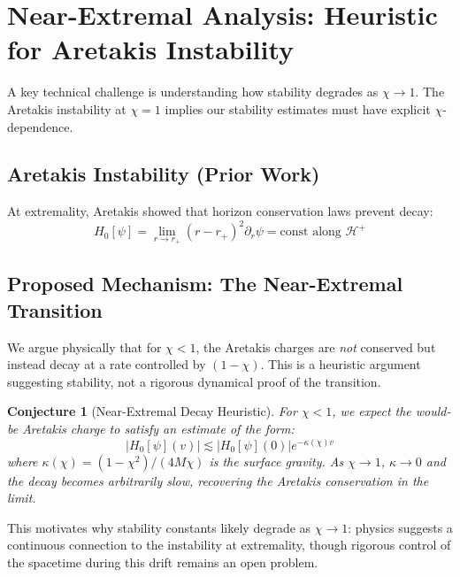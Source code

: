 \documentclass[12pt,a4paper]{article}
\newtheorem{conjecture}[theorem]{Conjecture}
\begin{document}
\section{Near-Extremal Analysis: Heuristic for Aretakis Instability}

A key technical challenge is understanding how stability degrades as $\chi \to 1$. The Aretakis instability at $\chi = 1$ implies our stability estimates must have explicit $\chi$-dependence.

\subsection{Aretakis Instability (Prior Work)}

At extremality, Aretakis showed that horizon conservation laws prevent decay:
\begin{equation}
H_0[\psi] = \lim_{r \to r_+} (r - r_+)^2 \partial_r \psi = \text{const along } \mathcal{H}^+
\end{equation}

\subsection{Proposed Mechanism: The Near-Extremal Transition}

We argue physically that for $\chi < 1$, the Aretakis charges are \textit{not} conserved but instead decay at a rate controlled by $(1-\chi)$. This is a heuristic argument suggesting stability, not a rigorous dynamical proof of the transition.

\begin{conjecture}[Near-Extremal Decay Heuristic]\label{conj:near-extremal}
For $\chi < 1$, we expect the would-be Aretakis charge to satisfy an estimate of the form:
\begin{equation}
|H_0[\psi](v)| \lesssim |H_0[\psi](0)| e^{-\kappa(\chi) v}
\end{equation}
where $\kappa(\chi) = (1-\chi^2)/(4M\chi)$ is the surface gravity. As $\chi \to 1$, $\kappa \to 0$ and the decay becomes arbitrarily slow, recovering the Aretakis conservation in the limit.
\end{conjecture}

This motivates why stability constants likely degrade as $\chi \to 1$: physics suggests a continuous connection to the instability at extremality, though rigorous control of the spacetime during this drift remains an open problem.
\end{document}
